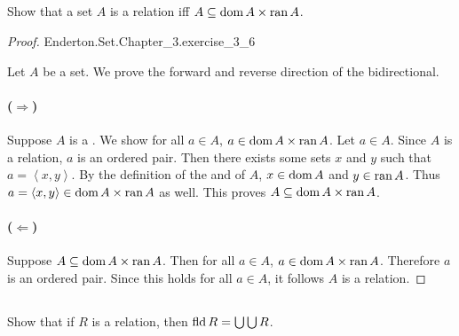 \documentclass{report}
\begin{document}
\subsection{}%
\label{sub:exercise-3.6}

Show that a set $A$ is a relation iff $A \subseteq \mathop{\text{dom}}{A} \times \mathop{\text{ran}}{A}$.

\begin{proof}

    {Enderton.Set.Chapter\_3.exercise\_3\_6}

  Let $A$ be a set.
  We prove the forward and reverse direction of the bidirectional.

  \paragraph{($\Rightarrow$)}%

    Suppose $A$ is a .
    We show for all $a \in A$, $a \in \mathop{\text{dom}}{A} \times \mathop{\text{ran}}{A}$.
    Let $a \in A$.
    Since $A$ is a relation, $a$ is an ordered pair.
    Then there exists some sets $x$ and $y$ such that $a = \left< x, y \right>$.
    By the definition of the  and  of
      $A$, $x \in \mathop{\text{dom}}{A}$ and $y \in \mathop{\text{ran}}{A}$.
    Thus $a = \left< x, y \right> \in \mathop{\text{dom}}{A} \times \mathop{\text{ran}}{A}$ as well.
    This proves $A \subseteq \mathop{\text{dom}}{A} \times \mathop{\text{ran}}{A}$.

  \paragraph{($\Leftarrow$)}%

    Suppose $A \subseteq \mathop{\text{dom}}{A} \times \mathop{\text{ran}}{A}$.
    Then for all $a \in A$, $a \in \mathop{\text{dom}}{A} \times \mathop{\text{ran}}{A}$.
    Therefore $a$ is an ordered pair.
    Since this holds for all $a \in A$, it follows $A$ is a relation.

\end{proof}

\subsection{}%
\label{sub:exercise-3.7}

Show that if $R$ is a relation, then $\mathop{\text{fld}}{R} = \bigcup\bigcup R$.
\end{document}
